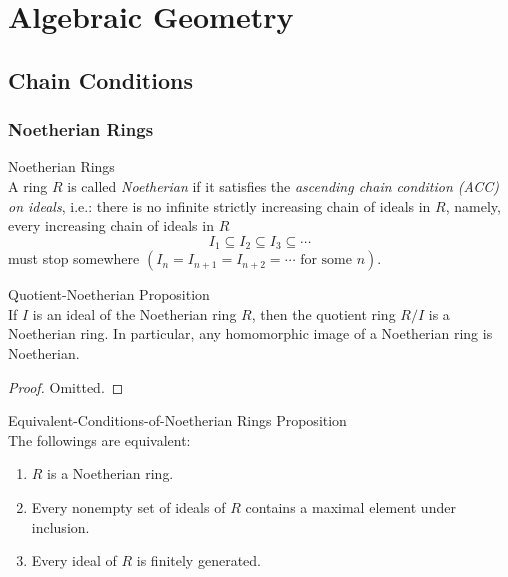 \chapter{Algebraic Geometry}
\section{Chain Conditions}

\subsection{Noetherian Rings}

\begin{definition}{Noetherian Rings}\\
A ring $R$ is called \textit{Noetherian} if it satisfies the \textit{ascending chain condition (ACC) on ideals}, i.e.: there is no infinite strictly increasing chain of ideals in $R$, namely, every increasing chain of ideals in $R$
$$I_1 \subseteq I_2 \subseteq I_3 \subseteq \cdots$$
must stop somewhere $(I_n= I_{n+1} = I_{n+2} = \cdots \text{ for some }n)$.
\end{definition}

\begin{proposition}{Quotient-Noetherian Proposition}\\
If $I$ is an ideal of the Noetherian ring $R$, then the quotient ring $R/I$ is a Noetherian ring. In particular, any homomorphic image of a Noetherian ring is Noetherian.
\end{proposition}

\begin{proof}
    Omitted.
\end{proof}

\begin{theorem}{Equivalent-Conditions-of-Noetherian Rings Proposition}\\
The followings are equivalent:
\begin{enumerate}
    \item $R$ is a Noetherian ring.
    \item Every nonempty set of ideals of $R$ contains a maximal element under inclusion.
    \item Every ideal of $R$ is finitely generated.
\end{enumerate}
\end{theorem}

